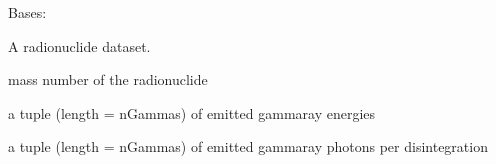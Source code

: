 \documentclass[letterpaper,10pt,english,openany,oneside]{sphinxmanual}
\begin{document}
\begin{fulllineitems}
\label{\detokenize{api/radionuclides:dxraylib.xraylib_radionuclides.radioNuclideData}}
\pysigstartsignatures
{}
\pysigstopsignatures
\sphinxAtStartPar
Bases: 

\sphinxAtStartPar
A radionuclide dataset.

\begin{fulllineitems}
\label{\detokenize{api/radionuclides:dxraylib.xraylib_radionuclides.radioNuclideData.A}}
\pysigstartsignatures
{}
\pysigstopsignatures
\sphinxAtStartPar
mass number of the radionuclide

\end{fulllineitems}


\begin{fulllineitems}
\label{\detokenize{api/radionuclides:dxraylib.xraylib_radionuclides.radioNuclideData.GammaEnergies}}
\pysigstartsignatures
{}
\pysigstopsignatures
\sphinxAtStartPar
a tuple (length = nGammas) of emitted gamma\sphinxhyphen{}ray energies

\end{fulllineitems}


\begin{fulllineitems}
\label{\detokenize{api/radionuclides:dxraylib.xraylib_radionuclides.radioNuclideData.GammaIntensities}}
\pysigstartsignatures
{}
\pysigstopsignatures
\sphinxAtStartPar
a tuple (length = nGammas) of emitted gamma\sphinxhyphen{}ray photons per
disintegration


\end{fulllineitems}
\end{fulllineitems}
\end{document}
